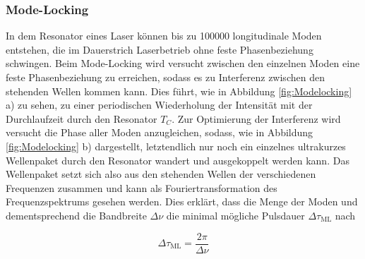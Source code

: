     \subsubsection{Mode-Locking}
      In dem Resonator eines Laser können bis zu 100000 longitudinale Moden entstehen, die im Dauerstrich Laserbetrieb ohne feste Phasenbeziehung schwingen. Beim Mode-Locking wird versucht zwischen den 
      einzelnen Moden eine feste Phasenbeziehung zu erreichen, sodass es zu Interferenz zwischen den stehenden Wellen kommen kann. Dies führt, wie in Abbildung \ref{fig:Modelocking} a) zu sehen, zu einer 
      periodischen Wiederholung der Intensität mit der Durchlaufzeit durch den Resonator $T_C$. Zur Optimierung der Interferenz wird versucht die Phase aller Moden anzugleichen, sodass, wie in 
      Abbildung \ref{fig:Modelocking} b) dargestellt, letztendlich nur noch ein einzelnes ultrakurzes Wellenpaket durch den Resonator wandert und ausgekoppelt werden kann. Das Wellenpaket setzt sich also
      aus den stehenden Wellen der verschiedenen Frequenzen zusammen und kann als Fouriertransformation des Frequenzspektrums gesehen werden. Dies erklärt, dass die Menge der Moden und dementsprechend die 
      Bandbreite $\Delta\nu$ die minimal mögliche Pulsdauer $\Delta\tau_{\text{ML}}$ nach

      \begin{equation*}
        \Delta\tau_{\text{ML}} = \frac{2\pi}{\Delta\nu}
      \end{equation*}

